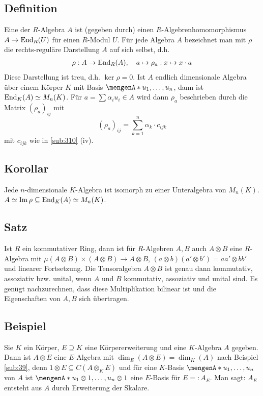 \subsection[Definition: Darstellung einer $R$-Algebra]{Definition} %
\label{sub:311}
Eine  der $R$-Algebra $A$ ist (gegeben durch) einen $R$-Algebrenhomomorphismus $A \to \operatorname{End}_R(U)$ für einen $R$-Modul $U$.
Für jede Algebra $A$ bezeichnet man mit $\rho$ die rechts-reguläre Darstellung $A$ auf sich selbst, d.h. 
\begin{align*}
	\rho : A \to \operatorname{End}_R(A), \quad a \mapsto \rho_a : x \mapsto x \cdot a 
\end{align*}
Diese Darstellung ist treu, d.h. $\ker \rho = 0$. Ist $A$ endlich dimensionale Algebra über einem Körper $K$ mit Basis $\set{u_1, \ldots , u_n}$, dann ist 
$\operatorname{End}_K(A) \simeq M_n(K)$. Für $a = \sum \alpha_i u_i \in A$ wird dann $\rho_a$ beschrieben durch die Matrix $(\rho_a)_{ij}$ mit 
\[
	(\rho_a)_{ij} = \sum_{k=1}^{n} \alpha_k \cdot c_{ijk}
\]
mit $c_{ijk}$ wie in \ref{sub:310} (iv).

\subsection[Korollar: Jede $n$-dimensionale $K$-Algebra ist isomorph zu Unteralgebra von $M_n(K)$]{Korollar} %
\label{sub:312}
Jede $n$-dimensionale $K$-Algebra ist isomorph zu einer Unteralgebra von $M_n(K)$.
$A \simeq \operatorname{Im} \rho \subseteq \operatorname{End}_K(A) \simeq M_n(K)$. \bewende

\subsection[Satz: Tensorprodukt von Algebren ist eine Algebra]{Satz} %
\label{sub:313}
Ist $R$ ein kommutativer Ring, dann ist für $R$-Algebren $A,B$ auch $A \otimes B$ eine $R$-Algebra mit $\mu (A \otimes B) \times (A \otimes B) \to A \otimes B$,
$(a \otimes b)(a' \otimes b') = a a' \otimes  b b'$ und linearer Fortsetzung. Die Tensoralgebra  $A \otimes B$ ist genau dann kommutativ, assoziativ bzw. unital, wenn $A$
und $B$ kommutativ, assoziativ und unital sind.
Es genügt nachzurechnen, dass diese Multiplikation bilinear ist und die Eigenschaften  von $A,B$ sich übertragen. \bewende

\subsection{Beispiel} %
\label{sub:314}
Sie $K$ ein Körper, $E \supseteq K$ eine Körpererweiterung und eine $K$-Algebra $A$ gegeben. Dann ist $A \otimes E$ eine $E$-Algebra mit $\dim_E(A \otimes E)= \dim_K(A)$
nach Beispiel \ref{sub:39}, denn $1 \otimes E \subseteq C(A \otimes_K E)$ und für eine $K$-Basis $\set{u_1, \ldots , u_n}$ von $A$ ist $\set{u_1 \otimes 1, \ldots , u_n \otimes 1} $ eine $E$-Basis für $E =: A_E$. Man sagt: $A_E$ entsteht aus $A$ durch Erweiterung der Skalare.
\newpage


